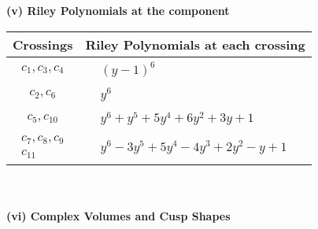 \documentclass[1p]{elsarticle_modified}
\theoremstyle{definition}
\begin{document}
\newpage\renewcommand{\arraystretch}{1}
\flushleft \textbf{(v) Riley Polynomials at the component}\newline \\
\begin{tabular}{m{50pt}|m{274pt}}
Crossings & \hspace{64pt}Riley Polynomials at each crossing \\
\hline $$\begin{aligned}c_{1},c_{3},c_{4}\end{aligned}$$&$\begin{aligned}
&(y-1)^6
\end{aligned}$\\
\hline $$\begin{aligned}c_{2},c_{6}\end{aligned}$$&$\begin{aligned}
&y^6
\end{aligned}$\\
\hline $$\begin{aligned}c_{5},c_{10}\end{aligned}$$&$\begin{aligned}
&y^6+y^5+5 y^4+6 y^2+3 y+1
\end{aligned}$\\
\hline $$\begin{aligned}c_{7},c_{8},c_{9}\\c_{11}\end{aligned}$$&$\begin{aligned}
&y^6-3 y^5+5 y^4-4 y^3+2 y^2- y+1
\end{aligned}$\\
\hline
\end{tabular}\\~\\
\newpage\flushleft \textbf{(vi) Complex Volumes and Cusp Shapes}
\end{document}
